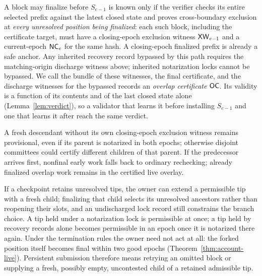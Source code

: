 A block may finalize before $S_{e-1}$ is known only if the verifier checks its entire selected prefix against the latest closed state and proves cross-boundary exclusion at \emph{every unresolved position being finalized}: each such block, including the certificate target, must have a closing-epoch exclusion witness $\mathsf{XW}_{e-1}$ and a current-epoch $\mathsf{NC}_e$ for the same hash. A closing-epoch finalized prefix is already a safe anchor. Any inherited recovery record bypassed by this path requires the matching-origin discharge witness above; inherited notarization locks cannot be bypassed. We call the bundle of these witnesses, the final certificate, and the discharge witnesses for the bypassed records an \emph{overlap certificate} $\mathsf{OC}$. Its validity is a function of its contents and of the last closed state alone (Lemma~\ref{lem:verdict}), so a validator that learns it before installing $S_{e-1}$ and one that learns it after reach the same verdict.

A fresh descendant without its own closing-epoch exclusion witness remains provisional, even if its parent is notarized in both epochs; otherwise disjoint committees could certify different children of that parent. If the predecessor arrives first, nonfinal early work falls back to ordinary rechecking; already finalized overlap work remains in the certified live overlay.

If a checkpoint retains unresolved tips, the owner can extend a permissible tip with a fresh child; finalizing that child selects its unresolved ancestors rather than reopening their slots, and an undischarged lock record still constrains the branch choice. A tip held under a notarization lock is permissible at once; a tip held by recovery records alone becomes permissible in an epoch once it is notarized there again. Under the termination rules the owner need not act at all: the forked position itself becomes final within two good epochs (Theorem~\ref{thm:account-live}). Persistent submission therefore means retrying an omitted block or supplying a fresh, possibly empty, uncontested child of a retained admissible tip.
